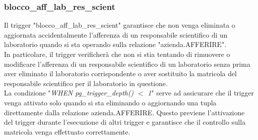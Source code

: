     \newpage

    \subsubsection{blocco\_aff\_lab\_res\_scient}
    Il trigger "blocco\_aff\_lab\_res\_scient" garantisce che non venga eliminata o aggiornata accidentalmente l'afferenza di un responsabile scientifico di un laboratorio quando si sta operando sulla relazione "azienda.AFFERIRE".\\
    In particolare, il trigger verificherà che non si stia tentando di rimuovere o modificare l'afferenza di un responsabile scientifico di un laboratorio senza prima aver eliminato il laboratorio corrispondente o aver sostituito la matricola del responsabile scientifico per il laboratorio in questione.\\
    La condizione "\textit{WHEN pg\_trigger\_depth() \(<\) 1}" serve ad assicurare che il trigger venga attivato solo quando si sta eliminando o aggiornando una tupla direttamente dalla relazione azienda.AFFERIRE. Questo previene l'attivazione del trigger durante l'esecuzione di altri trigger e garantisce che il controllo sulla matricola venga effettuato correttamente.
    \ttfamily
